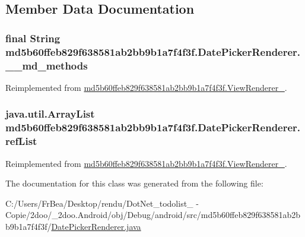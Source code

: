 \subsection{Member Data Documentation}
\hypertarget{classmd5b60ffeb829f638581ab2bb9b1a7f4f3f_1_1_date_picker_renderer_db56115e96abb1e11b6f6ceebbadb704}{
\subsubsection[{\_\-\_\-md\_\-methods}]{\setlength{\rightskip}{0pt plus 5cm}final String {\bf md5b60ffeb829f638581ab2bb9b1a7f4f3f.DatePickerRenderer.\_\-\_\-md\_\-methods}}}
\label{classmd5b60ffeb829f638581ab2bb9b1a7f4f3f_1_1_date_picker_renderer_db56115e96abb1e11b6f6ceebbadb704}




Reimplemented from \hyperlink{classmd5b60ffeb829f638581ab2bb9b1a7f4f3f_1_1_view_renderer__2_80b609e3e4054c380887d4dc2907a875}{md5b60ffeb829f638581ab2bb9b1a7f4f3f.ViewRenderer\_}.\hypertarget{classmd5b60ffeb829f638581ab2bb9b1a7f4f3f_1_1_date_picker_renderer_5c0de23da8ef6f756d8fd093f26c30c6}{
\subsubsection[{refList}]{\setlength{\rightskip}{0pt plus 5cm}java.util.ArrayList {\bf md5b60ffeb829f638581ab2bb9b1a7f4f3f.DatePickerRenderer.refList}}}
\label{classmd5b60ffeb829f638581ab2bb9b1a7f4f3f_1_1_date_picker_renderer_5c0de23da8ef6f756d8fd093f26c30c6}




Reimplemented from \hyperlink{classmd5b60ffeb829f638581ab2bb9b1a7f4f3f_1_1_view_renderer__2_6c151401977148a92c515e9c7de1aaf8}{md5b60ffeb829f638581ab2bb9b1a7f4f3f.ViewRenderer\_}.

The documentation for this class was generated from the following file:\begin{CompactItemize}
\item 
C:/Users/FrBea/Desktop/rendu/DotNet\_\-todolist\_ - Copie/2doo/\_\-2doo.Android/obj/Debug/android/src/md5b60ffeb829f638581ab2bb9b1a7f4f3f/\hyperlink{_date_picker_renderer_8java}{DatePickerRenderer.java}\end{CompactItemize}
